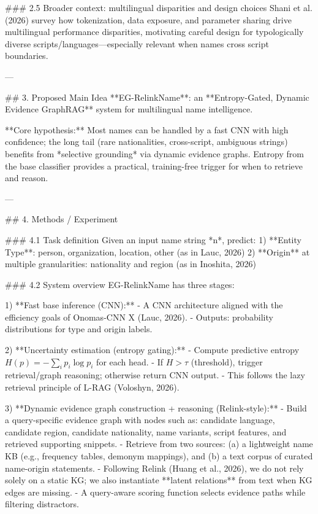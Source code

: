 ### 2.5 Broader context: multilingual disparities and design choices  
Shani et al. (2026) survey how tokenization, data exposure, and parameter sharing drive multilingual performance disparities, motivating careful design for typologically diverse scripts/languages—especially relevant when names cross script boundaries.

---

## 3. Proposed Main Idea  
**EG-RelinkName**: an **Entropy-Gated, Dynamic Evidence GraphRAG** system for multilingual name intelligence.

**Core hypothesis:** Most names can be handled by a fast CNN with high confidence; the long tail (rare nationalities, cross-script, ambiguous strings) benefits from *selective grounding* via dynamic evidence graphs. Entropy from the base classifier provides a practical, training-free trigger for when to retrieve and reason.

---

## 4. Methods / Experiment  

### 4.1 Task definition  
Given an input name string *n*, predict:  
1) **Entity Type**: {person, organization, location, other} (as in Lauc, 2026)  
2) **Origin** at multiple granularities: nationality and region (as in Inoshita, 2026)

### 4.2 System overview  
EG-RelinkName has three stages:

1) **Fast base inference (CNN):**  
   - A CNN architecture aligned with the efficiency goals of Onomas-CNN X (Lauc, 2026).  
   - Outputs: probability distributions for type and origin labels.

2) **Uncertainty estimation (entropy gating):**  
   - Compute predictive entropy \(H(p)=-\sum_i p_i\log p_i\) for each head.  
   - If \(H > \tau\) (threshold), trigger retrieval/graph reasoning; otherwise return CNN output.  
   - This follows the lazy retrieval principle of L-RAG (Voloshyn, 2026).

3) **Dynamic evidence graph construction + reasoning (Relink-style):**  
   - Build a query-specific evidence graph with nodes such as: candidate language, candidate region, candidate nationality, name variants, script features, and retrieved supporting snippets.  
   - Retrieve from two sources:  
     (a) a lightweight name KB (e.g., frequency tables, demonym mappings), and  
     (b) a text corpus of curated name-origin statements.  
   - Following Relink (Huang et al., 2026), we do not rely solely on a static KG; we also instantiate **latent relations** from text when KG edges are missing.  
   - A query-aware scoring function selects evidence paths while filtering distractors.

